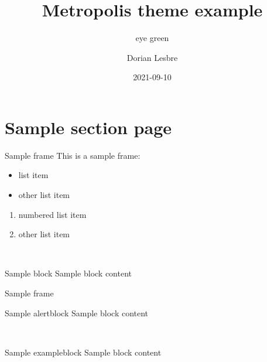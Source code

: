 \documentclass[14pt]{beamer}
\title{Metropolis theme example}
\subtitle{eye green}
\author{Dorian Lesbre}
\date{2021-09-10}
\begin{document}
\begin{frame}
	\titlepage
\end{frame}

\section{Sample section page}

\begin{frame}{Sample frame}
	This is a sample frame:
	\begin{multicols}{2}
		\begin{itemize}
			\item list item
			\item other list item
		\end{itemize}
		\begin{enumerate}
			\item numbered list item
			\item other list item
		\end{enumerate}
	\end{multicols}
	~\\
	\begin{block}{Sample block}
		Sample block content
	\end{block}
\end{frame}

\begin{frame}{Sample frame}

	\begin{alertblock}{Sample alertblock}
		Sample block content
	\end{alertblock}
	~\\
	\begin{exampleblock}{Sample exampleblock}
		Sample block content
	\end{exampleblock}
\end{frame}
\end{document}
